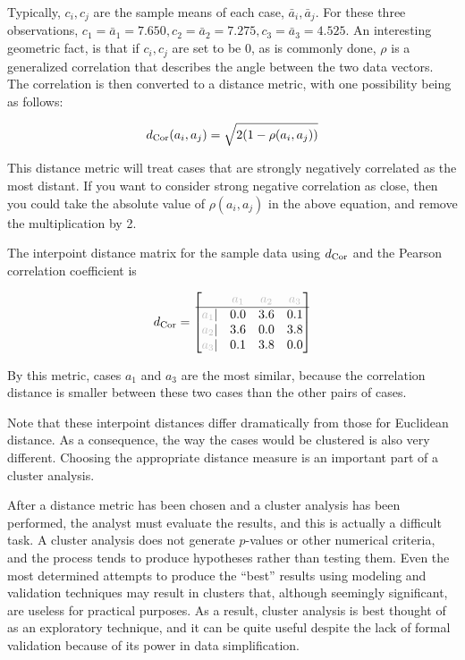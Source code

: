 \documentclass[
  letterpaper,
]{krantz}
\begin{document}
\noindent Typically, \(c_i, c_j\) are the sample means of each case,
\(\bar{a}_i,\bar{a}_j\). For these three observations,
\(c_1=\bar{a}_1=7.650, c_2=\bar{a}_2=7.275, c_3=\bar{a}_3=4.525\). An
interesting geometric fact, is that if \(c_i, c_j\) are set to be 0, as
is commonly done, \(\rho\) is a generalized correlation that describes
the angle between the two data vectors. The correlation is then
converted to a distance metric, with one possibility being as follows:

\begin{align*}
d_{\rm Cor}(a_i,a_j) = \sqrt{2(1-\rho(a_i,a_j))}
\end{align*}

This distance metric will treat cases that are strongly negatively
correlated as the most distant. If you want to consider strong negative
correlation as close, then you could take the absolute value of
\(\rho(a_i,a_j)\) in the above equation, and remove the multiplication
by 2.

The interpoint distance matrix for the sample data using \(d_{\rm Cor}\)
and the Pearson correlation coefficient is

\begin{align*}
d_{\rm Cor} = \begin{bmatrix}
& {\color{grey} a_1} & {\color{grey} a_2} & {\color{grey} a_3} \\\hline
{\color{grey} a_1} | & 0.0 & 3.6 & 0.1 \\
{\color{grey} a_2} | & 3.6 & 0.0 & 3.8 \\
{\color{grey} a_3} | & 0.1 & 3.8 & 0.0
\end{bmatrix}
\end{align*}

\noindent By this metric, cases \(a_1\) and \(a_3\) are the most
similar, because the correlation distance is smaller between these two
cases than the other pairs of cases.

Note that these interpoint distances differ dramatically from those for
Euclidean distance. As a consequence, the way the cases would be
clustered is also very different. Choosing the appropriate distance
measure is an important part of a cluster analysis.

After a distance metric has been chosen and a cluster analysis has been
performed, the analyst must evaluate the results, and this is actually a
difficult task. A cluster analysis does not generate \(p\)-values or
other numerical criteria, and the process tends to produce hypotheses
rather than testing them. Even the most determined attempts to produce
the ``best'' results using modeling and validation techniques may result
in clusters that, although seemingly significant, are useless for
practical purposes. As a result, cluster analysis is best thought of as
an exploratory technique, and it can be quite useful despite the lack of
formal validation because of its power in data simplification.
\end{document}

